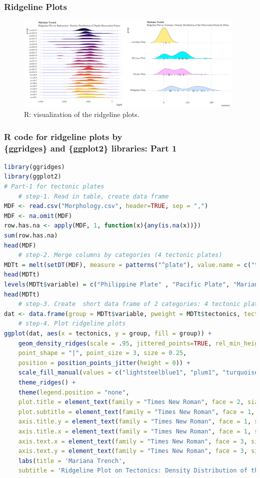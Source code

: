\documentclass[pdflatex,compress,10pt,
	xcolor={dvipsnames,dvipsnames,svgnames,x11names,table},
	hyperref={colorlinks = true,breaklinks = true, urlcolor = NavyBlue, breaklinks = true}]{beamer}
\begin{document}
\begin{frame}\frametitle{Ridgeline Plots}
\begin{figure}[H]
	\centering
		\includegraphics[width=11cm]{Fig-2-10.jpg}
	\caption{R: visualization of the ridgeline plots.}
\end{figure}		
\end{frame}

\begin{frame}[fragile,shrink=20]\frametitle{R code for ridgeline plots by\\ \{ggridges\} and \{ggplot2\} libraries: Part 1}
\begin{lstlisting}[language=R]
library(ggridges)
library(ggplot2)
# Part-1 for tectonic plates
	# step-1. Read in table, create data frame 
MDF <- read.csv("Morphology.csv", header=TRUE, sep = ",")
MDF <- na.omit(MDF) 
row.has.na <- apply(MDF, 1, function(x){any(is.na(x))}) 
sum(row.has.na) 
head(MDF)
	# step-2. Merge columns by categories (4 tectonic plates)
MDTt = melt(setDT(MDF), measure = patterns("^plate"), value.name = c("tectonics"))
head(MDTt)
levels(MDTt$variable) = c("Philippine Plate" , "Pacific Plate", "Mariana Plate", "Caroline Plate")
head(MDTt)
	# step-3. Create  short data frame of 2 categories: 4 tectonic plates and bathymetric depth points
dat <- data.frame(group = MDTt$variable, pweight = MDTt$tectonics, tectonics = MDTt$tectonics)
	# step-4. Plot ridgeline plots
ggplot(dat, aes(x = tectonics, y = group, fill = group)) + 
	geom_density_ridges(scale = .95, jittered_points=TRUE, rel_min_height = .01,
	point_shape = "|", point_size = 3, size = 0.25,
	position = position_points_jitter(height = 0)) +
	scale_fill_manual(values = c("lightsteelblue1", "plum1", "turquoise1", "lightgoldenrod1")) +
	theme_ridges() +
	theme(legend.position = "none",
	plot.title = element_text(family = "Times New Roman", face = 2, size = 12),
	plot.subtitle = element_text(family = "Times New Roman", face = 1, size = 12),
	axis.title.y = element_text(family = "Times New Roman", face = 1, size = 12),
	axis.title.x = element_text(family = "Times New Roman", face = 1, size = 12),
	axis.text.x = element_text(family = "Times New Roman", face = 3, size = 12),
	axis.text.y = element_text(family = "Times New Roman", face = 3, size = 12)) +
	labs(title = 'Mariana Trench',
	subtitle = 'Ridgeline Plot on Tectonics: Density Distribution of the Observation Points by Plates') 
\end{lstlisting}
\end{frame}
\end{document}
